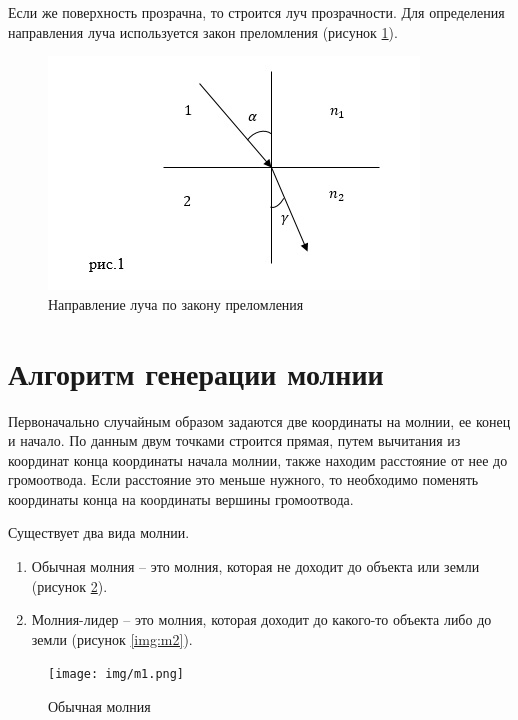 Если же поверхность прозрачна, то строится луч прозрачности. Для определения направления луча используется закон преломления (рисунок \ref{img:lomka-2}).

\begin{figure}[ht!]
	\begin{center}
		\captionsetup{singlelinecheck = false, justification=centerfirst}
		\includegraphics[scale=1]{assets/lomka-2.jpeg}
		\caption{Направление луча по закону преломления}
		\label{img:lomka-2}
	\end{center}
	
\end{figure}

\section{Алгоритм генерации молнии}
Первоначально случайным образом задаются две координаты на молнии, ее конец и начало. По данным двум точками строится прямая, путем вычитания из координат конца координаты начала молнии, также находим расстояние от нее до громоотвода. Если расстояние это меньше нужного, то необходимо поменять координаты конца на координаты вершины громоотвода.

Существует два вида молнии.
\begin{enumerate}
	\item Обычная молния -- это молния, которая не доходит до объекта или земли (рисунок \ref{img:m1}).
	\item Молния-лидер -- это молния, которая доходит до какого-то объекта либо до земли (рисунок \ref{img:m2}). 
\end{enumerate}

\begin{figure}[H]
	\begin{center}
		\texttt{[image: img/m1.png]}
	\end{center}
	\captionsetup{justification=centering}
	\caption{Обычная молния}
	\label{img:m1}
\end{figure}

